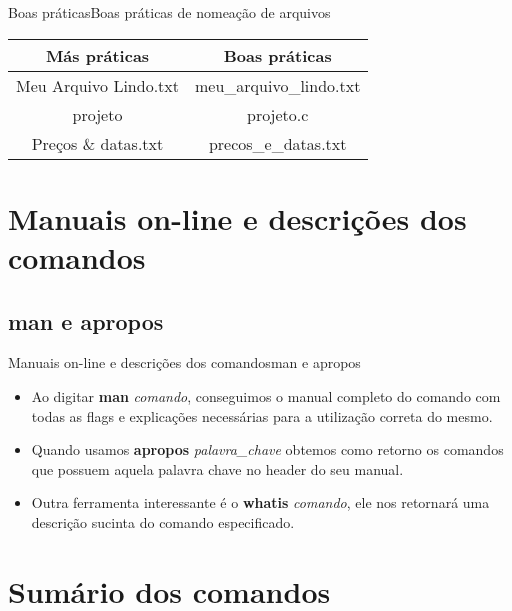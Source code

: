 \documentclass{beamer}
\begin{document}
 \begin{frame}{Boas práticas}{Boas práticas de nomea\c{c}ão de arquivos}
   \begin{center}
 \begin{tabular}{||c | c||} 
 \hline
 \textbf{Más práticas} & \textbf{Boas práticas}\\ [0.5ex] 
 \hline\hline
 Meu Arquivo Lindo.txt & meu\_arquivo\_lindo.txt\\ 
 \hline
 projeto & projeto.c\\
 \hline
 Pre\c{c}os \& datas.txt & precos\_e\_datas.txt\\
 \hline
\end{tabular}
\end{center}
\end{frame}

\section{Manuais on-line e descri\c{c}ões dos comandos}
\subsection{man e apropos}
\begin{frame}{Manuais on-line e descri\c{c}ões dos comandos}{man e apropos}
\begin{itemize}
\item {Ao digitar \textbf{man} \textit{comando}, conseguimos o manual completo do comando com todas as flags e explica\c{c}ões necessárias para a utiliza\c{c}ão correta do mesmo.}
\item{Quando usamos \textbf{apropos} \textit{palavra\_chave} obtemos como retorno os comandos que possuem aquela palavra chave no header do seu manual.}
\item{Outra ferramenta interessante é o \textbf{whatis} \textit{comando}, ele nos retornará uma descri\c{c}ão sucinta do comando especificado. }
\end{itemize}
\end{frame}

\section*{Sumário dos comandos}
\end{document}
